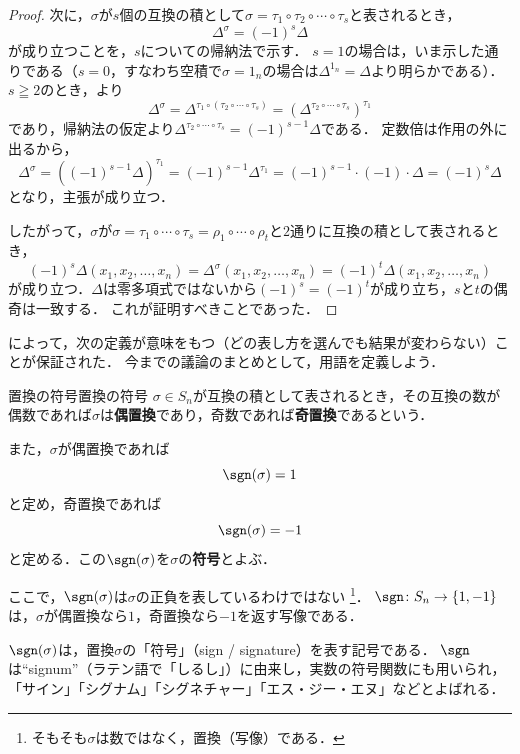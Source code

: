 \begin{tleftbar}
\begin{proof}
  次に，$\sigma$が$s$個の互換の積として$\sigma = \tau_1 \circ \tau_2 \circ \cdots \circ \tau_s$と表されるとき，
  \[
    \Delta^{\sigma} = (-1)^s \Delta
  \]
  が成り立つことを，$s$についての帰納法で示す．
  $s = 1$の場合は，いま示した通りである（$s = 0$，すなわち空積で$\sigma = 1_n$の場合は$\Delta^{1_n} = \Delta$より明らかである）．
  $s \geqq 2$のとき，より
  \[
    \Delta^{\sigma}
    = \Delta^{\tau_1 \circ (\tau_2 \circ \cdots \circ \tau_s)}
    = \left( \Delta^{\tau_2 \circ \cdots \circ \tau_s} \right)^{\tau_1}
  \]
  であり，帰納法の仮定より$\Delta^{\tau_2 \circ \cdots \circ \tau_s} = (-1)^{s-1}\Delta$である．
  定数倍は作用の外に出るから，
  \[
    \Delta^{\sigma}
    = \left( (-1)^{s-1}\Delta \right)^{\tau_1}
    = (-1)^{s-1}\Delta^{\tau_1}
    = (-1)^{s-1} \cdot (-1) \cdot \Delta
    = (-1)^s \Delta
  \]
  となり，主張が成り立つ．

  したがって，$\sigma$が$\sigma = \tau_1 \circ \cdots \circ \tau_s = \rho_1 \circ \cdots \circ \rho_t$と$2$通りに互換の積として表されるとき，
  \[
  (-1)^s \Delta (x_1, x_2, \dots, x_n)
  = \Delta^{\sigma} (x_1, x_2, \dots, x_n)
  = (-1)^t \Delta (x_1, x_2, \dots, x_n)
  \]
  が成り立つ．$\Delta$は零多項式ではないから$(-1)^s = (-1)^t$が成り立ち，$s$と$t$の偶奇は一致する．
  これが証明すべきことであった．
\end{proof}
\end{tleftbar}

によって，次の定義が意味をもつ（どの表し方を選んでも結果が変わらない）ことが保証された．
今までの議論のまとめとして，用語を定義しよう．

\begin{definition}{置換の符号}{置換の符号}
  $\sigma \in S_n$が互換の積として表されるとき，その互換の数が偶数であれば$\sigma$は\textbf{偶置換}であり，奇数であれば\textbf{奇置換}であるという．
  
  また，$\sigma$が偶置換であれば
  \[
  \sgn(\sigma) = 1
  \]
  と定め，奇置換であれば
  \[
  \sgn(\sigma) = -1
  \]
  と定める．この$\sgn(\sigma)$を$\sigma$の\textbf{符号}とよぶ．
\end{definition}

ここで，$\sgn(\sigma)$は$\sigma$の正負を表しているわけではない
\footnote{そもそも$\sigma$は数ではなく，置換（写像）である．}．
$\sgn \colon S_n \to \{1,-1\}$は，$\sigma$が偶置換なら$1$，奇置換なら$-1$を返す写像である．

\begin{mycolumn}
  $\sgn(\sigma)$は，置換$\sigma$の「符号」（sign / signature）を表す記号である．
  $\sgn$は``signum''（ラテン語で「しるし」）に由来し，実数の符号関数にも用いられ，「サイン」「シグナム」「シグネチャー」「エス・ジー・エヌ」などとよばれる．
\end{mycolumn}

